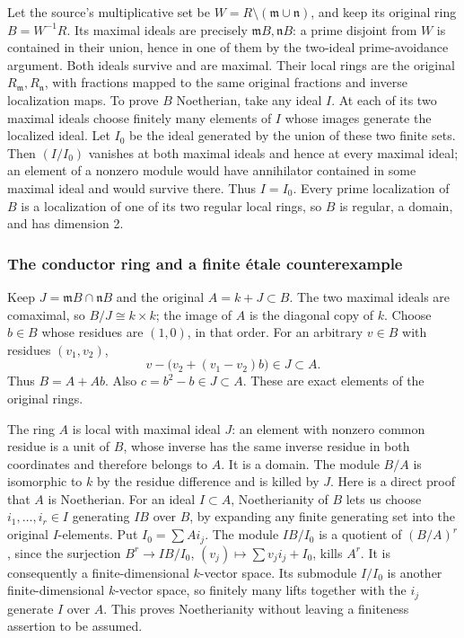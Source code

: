 Let the source's multiplicative set be \(W=R\setminus(\mathfrak m\cup\mathfrak n)\), and keep its original ring \(B=W^{-1}R\). Its maximal ideals are precisely \(\mathfrak mB,\mathfrak nB\): a prime disjoint from \(W\) is contained in their union, hence in one of them by the two-ideal prime-avoidance argument. Both ideals survive and are maximal. Their local rings are the original \(R_{\mathfrak m},R_{\mathfrak n}\), with fractions mapped to the same original fractions and inverse localization maps. To prove \(B\) Noetherian, take any ideal \(I\). At each of its two maximal ideals choose finitely many elements of \(I\) whose images generate the localized ideal. Let \(I_0\) be the ideal generated by the union of these two finite sets. Then \((I/I_0)\) vanishes at both maximal ideals and hence at every maximal ideal; an element of a nonzero module would have annihilator contained in some maximal ideal and would survive there. Thus \(I=I_0\). Every prime localization of \(B\) is a localization of one of its two regular local rings, so \(B\) is regular, a domain, and has dimension 2.

\subsubsection{The conductor ring and a finite étale counterexample}\label{algebra-proof-069-the-conductor-ring-and-a-finite-uxe9tale-counterexample}

Keep \(J=\mathfrak mB\cap\mathfrak nB\) and the original \(A=k+J\subset B\). The two maximal ideals are comaximal, so \(B/J\cong k\times k\); the image of \(A\) is the diagonal copy of \(k\). Choose \(b\in B\) whose residues are \((1,0)\), in that order. For an arbitrary \(v\in B\) with residues \((v_1,v_2)\), \[
 v-\bigl(v_2+(v_1-v_2)b\bigr)\in J\subset A.
\] Thus \(B=A+Ab\). Also \(c=b^2-b\in J\subset A\). These are exact elements of the original rings.

The ring \(A\) is local with maximal ideal \(J\): an element with nonzero common residue is a unit of \(B\), whose inverse has the same inverse residue in both coordinates and therefore belongs to \(A\). It is a domain. The module \(B/A\) is isomorphic to \(k\) by the residue difference and is killed by \(J\). Here is a direct proof that \(A\) is Noetherian. For an ideal \(I\subset A\), Noetherianity of \(B\) lets us choose \(i_1,\ldots,i_r\in I\) generating \(IB\) over \(B\), by expanding any finite generating set into the original \(I\)-elements. Put \(I_0=\sum Ai_j\). The module \(IB/I_0\) is a quotient of \((B/A)^r\), since the surjection \(B^r\to IB/I_0\), \((v_j)\mapsto\sum v_ji_j+I_0\), kills \(A^r\). It is consequently a finite-dimensional \(k\)-vector space. Its submodule \(I/I_0\) is another finite-dimensional \(k\)-vector space, so finitely many lifts together with the \(i_j\) generate \(I\) over \(A\). This proves Noetherianity without leaving a finiteness assertion to be assumed.

